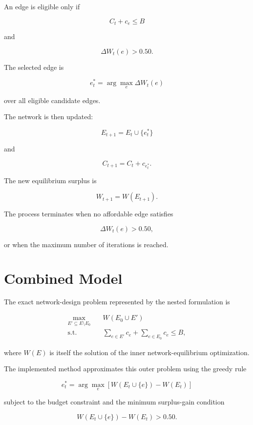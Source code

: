 \documentclass[11pt]{article}
\begin{document}
An edge is eligible only if

\[
\boxed{
C_t+c_e\le B
}
\]

and

\[
\boxed{
\Delta W_t(e)>0.50.
}
\]

The selected edge is

\[
\boxed{
e_t^*
=
\arg\max_{e}
\Delta W_t(e)
}
\]

over all eligible candidate edges.

The network is then updated:

\[
\boxed{
E_{t+1}=E_t\cup\{e_t^*\}
}
\]

and

\[
\boxed{
C_{t+1}=C_t+c_{e_t^*}.
}
\]

The new equilibrium surplus is

\[
\boxed{
W_{t+1}=W(E_{t+1}).
}
\]

The process terminates when no affordable edge satisfies

\[
\Delta W_t(e)>0.50,
\]

or when the maximum number of iterations is reached.

\section{Combined Model}

The exact network-design problem represented by the nested formulation is

\[
\boxed{
\begin{aligned}
\max_{E'\subseteq E\setminus E_0}
\quad&
W(E_0\cup E')
\\
\text{s.t.}\quad&
\sum_{e\in E'}c_e+
\sum_{e\in E_0}c_e
\le B,
\end{aligned}
}
\]

where $W(E)$ is itself the solution of the inner network-equilibrium optimization.

The implemented method approximates this outer problem using the greedy rule

\[
\boxed{
e_t^*
=
\arg\max_e
\left[
W(E_t\cup\{e\})-W(E_t)
\right]
}
\]

subject to the budget constraint and the minimum surplus-gain condition

\[
\boxed{
W(E_t\cup\{e\})-W(E_t)>0.50.
}
\]
\end{document}
